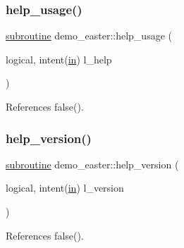 \mbox{\label{easter_8f90_ab07ad49e68ac3d3df8e071fd42bbf84e}} 
\subsubsection{\texorpdfstring{help\+\_\+usage()}{help\_usage()}}
{\footnotesize\ttfamily \hyperlink{M__stopwatch_83_8txt_acfbcff50169d691ff02d4a123ed70482}{subroutine} demo\+\_\+easter\+::help\+\_\+usage (\begin{DoxyParamCaption}\item[{logical, intent(\hyperlink{M__journal_83_8txt_afce72651d1eed785a2132bee863b2f38}{in})}]{l\+\_\+help }\end{DoxyParamCaption})}



References false().

\mbox{\label{easter_8f90_af4f863a9a969771c1766c7a11ae2ac43}} 
\subsubsection{\texorpdfstring{help\+\_\+version()}{help\_version()}}
{\footnotesize\ttfamily \hyperlink{M__stopwatch_83_8txt_acfbcff50169d691ff02d4a123ed70482}{subroutine} demo\+\_\+easter\+::help\+\_\+version (\begin{DoxyParamCaption}\item[{logical, intent(\hyperlink{M__journal_83_8txt_afce72651d1eed785a2132bee863b2f38}{in})}]{l\+\_\+version }\end{DoxyParamCaption})}



References false().

